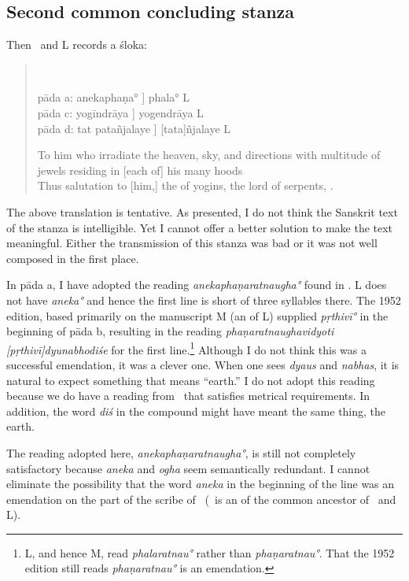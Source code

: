 \subsection{Second common concluding stanza}
\label{patanjaliverseone}
Then \Tm\ and L records a śloka:
\begin{verse}

\\
{\footnotesize 
pāda a: anekaphaṇa° \Tm] phala° L\\
pāda c: yogīndrāya \Tm] yogendrāya L \\
pāda d: tat patañjalaye \Tm] [tata]ñjalaye L

}
To him who irradiate the heaven, sky, and directions with multitude of jewels residing in [each of] his many hoods \\
Thus salutation to [him,] the  of yogins, the lord of serpents, \Patanjali.
\end{verse}
The above translation is tentative. As presented, I do not think the Sanskrit text of the stanza is intelligible. Yet I cannot offer a better solution to make the text meaningful. Either the transmission of this stanza was bad or it was not well composed in the first place.

In pāda a, I have adopted the reading \emph{anekaphaṇaratnaugha°} found in \Tm. L does not have \emph{aneka°} and hence the first line is short of three syllables there. The 1952 edition, based primarily on the manuscript M (an  of L) supplied \emph{pṛthivī°} in the beginning of pāda b, resulting in the reading \emph{phaṇa\-ratnau\-gha\-vidyoti [pṛthivī]dyunabhodiśe} for the first line.\footnote{L, and hence M, read \emph{phalaratnau°} rather than \emph{phaṇaratnau°}. That the 1952 edition still reads \emph{phaṇaratnau°} is an emendation.} Although I do not think this was a successful emendation, it was a clever one. When one sees \emph{dyaus} and \emph{nabhas}, it is natural to expect something that means ``earth.'' I do not adopt this reading because we do have a reading from \Tm\ that satisfies metrical requirements. In addition, the word \emph{diś} in the compound might have meant the same thing, the earth. 

The reading adopted here, \emph{anekaphaṇaratnaugha°}, is still not completely satisfactory because \emph{aneka} and \emph{ogha} seem semantically redundant. I cannot eliminate the possibility that the word \emph{aneka} in the beginning of the line was an emendation on the part of the scribe of \Tm\ (\Tm\ is an  of the common ancestor of \Tm\ and L). 

